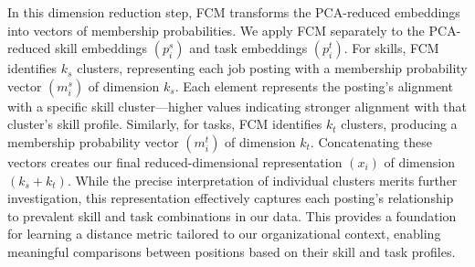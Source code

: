 In this dimension reduction step, FCM transforms the PCA-reduced embeddings into vectors of membership probabilities. 
We apply FCM separately to the PCA-reduced skill embeddings $(p_i^s)$ and task embeddings $(p_i^t)$. For skills, 
FCM identifies $k_s$ clusters, representing each job posting with a membership probability vector $(m_i^s)$ of 
dimension $k_s$. Each element represents the posting's alignment with a specific skill cluster---higher values 
indicating stronger alignment with that cluster's skill profile. Similarly, for tasks, FCM identifies $k_t$ 
clusters, producing a membership probability vector $(m_i^t)$ of dimension $k_t$. Concatenating these vectors 
creates our final reduced-dimensional representation $(x_i)$ of dimension $(k_s + k_t)$. While the precise 
interpretation of individual clusters merits further investigation, this representation effectively captures 
each posting's relationship to prevalent skill and task combinations in our data. This provides a foundation 
for learning a distance metric tailored to our organizational context, enabling meaningful comparisons between 
positions based on their skill and task profiles.


